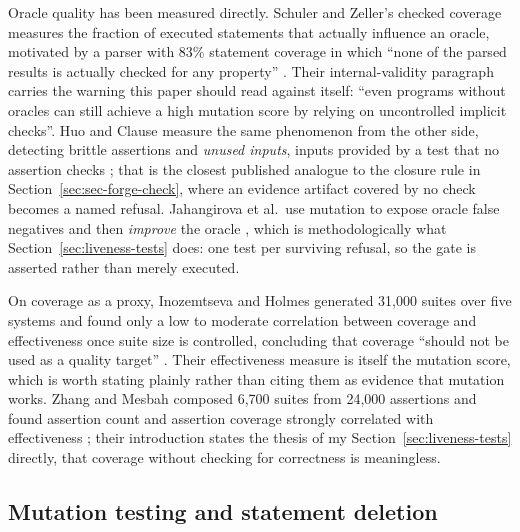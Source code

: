 \documentclass[11pt]{article}
\begin{document}
Oracle quality has been measured directly. Schuler and Zeller's checked coverage measures
the fraction of executed statements that actually influence an oracle, motivated by a parser
with 83\% statement coverage in which ``none of the parsed results is actually checked for
any property'' \citep{schuler2011checkedcov,schuler2013checkedcov}. Their internal-validity
paragraph carries the warning this paper should read against itself: ``even programs without
oracles can still achieve a high mutation score by relying on uncontrolled implicit
checks''. Huo and Clause measure the same phenomenon from the other side, detecting brittle
assertions and \emph{unused inputs}, inputs provided by a test that no assertion checks
\citep{huo2014oracle}; that is the closest published analogue to the closure rule in
Section~\ref{sec:sec-forge-check}, where an evidence artifact covered by no check becomes a
named refusal. Jahangirova et al.\ use mutation to expose oracle false negatives and then
\emph{improve} the oracle \citep{jahangirova2016oracle}, which is methodologically what
Section~\ref{sec:liveness-tests} does: one test per surviving refusal, so the gate is
asserted rather than merely executed.

On coverage as a proxy, Inozemtseva and Holmes generated 31,000 suites over five systems and
found only a low to moderate correlation between coverage and effectiveness once suite size
is controlled, concluding that coverage ``should not be used as a quality target''
\citep{inozemtseva2014coverage}. Their effectiveness measure is itself the mutation score,
which is worth stating plainly rather than citing them as evidence that mutation works.
Zhang and Mesbah composed 6,700 suites from 24,000 assertions and found assertion count and
assertion coverage strongly correlated with effectiveness \citep{zhang2015assertions}; their
introduction states the thesis of my Section~\ref{sec:liveness-tests} directly, that
coverage without checking for correctness is meaningless.

\subsection{Mutation testing and statement deletion}
\end{document}
